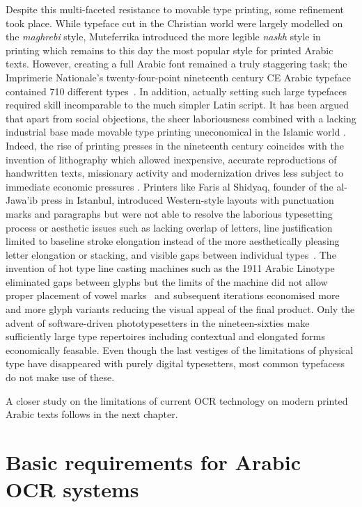 Despite this multi-faceted resistance to movable type printing, some refinement
took place. While typeface cut in the Christian world were largely modelled on
the \emph{maghrebi} style, Muteferrika introduced the more legible \emph{naskh}
style in printing which remains to this day the most popular style for printed
Arabic texts. However, creating a full Arabic font remained a truly staggering
task; the Imprimerie Nationale's twenty-four-point nineteenth century CE Arabic
typeface contained 710 different types~\cite[pg. 218]{bloompaper}. In addition,
actually setting such large typefaces required skill incomparable to the much
simpler Latin script. It has been argued that apart from social objections, the
sheer laboriousness combined with a lacking industrial base made movable type
printing uneconomical in the Islamic world \cite{auji2017neither}. Indeed, the
rise of printing presses in the nineteenth century coincides with the invention
of lithography which allowed inexpensive, accurate reproductions of handwritten
texts, missionary activity and modernization drives less subject to immediate
economic pressures \cite{turner1996dictionary}. Printers like Faris al Shidyaq,
founder of the al-Jawa'ib press in Istanbul, introduced Western-style layouts
with punctuation marks and paragraphs but were not able to resolve the
laborious typesetting process or aesthetic issues such as lacking overlap of
letters, line justification limited to baseline stroke elongation instead of
the more aesthetically pleasing letter elongation or stacking, and visible gaps
between individual types~\cite[pg. 605]{blair2006islamic}. The invention of hot
type line casting machines such as the 1911 Arabic Linotype eliminated gaps
between glyphs but the limits of the machine did not allow proper placement of
vowel marks~\cite[pg. 67]{nemeth2017arabic} and subsequent iterations
economised more and more glyph variants reducing the visual appeal of the final
product. Only the advent of software-driven phototypesetters in the
nineteen-sixties make sufficiently large type repertoires including contextual
and elongated forms economically feasable. Even though the last vestiges of the
limitations of physical type have disappeared with purely digital typesetters,
most common typefacess do not make use of these.

A closer study on the limitations of current OCR technology on modern printed
Arabic texts follows in the next chapter.

\section{Basic requirements for Arabic OCR systems}

